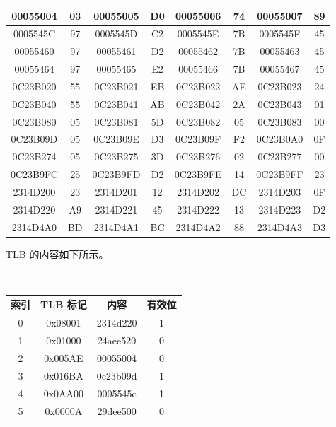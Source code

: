 \begin{problems}
\begin{table}[H]
\begin{tabular}{|c|c|c|c|c|c|c|c|}
                00055004 & 03 & 00055005 & D0 & 00055006 & 74 & 00055007 & 89 \\ \hline
                0005545C & 97 & 0005545D & C2 & 0005545E & 7B & 0005545F & 45 \\ \hline
                00055460 & 97 & 00055461 & D2 & 00055462 & 7B & 00055463 & 45 \\ \hline
                00055464 & 97 & 00055465 & E2 & 00055466 & 7B & 00055467 & 45 \\ \hline
                0C23B020 & 55 & 0C23B021 & EB & 0C23B022 & AE & 0C23B023 & 24 \\ \hline
                0C23B040 & 55 & 0C23B041 & AB & 0C23B042 & 2A & 0C23B043 & 01 \\ \hline
                0C23B080 & 05 & 0C23B081 & 5D & 0C23B082 & 05 & 0C23B083 & 00 \\ \hline
                0C23B09D & 05 & 0C23B09E & D3 & 0C23B09F & F2 & 0C23B0A0 & 0F \\ \hline
                0C23B274 & 05 & 0C23B275 & 3D & 0C23B276 & 02 & 0C23B277 & 00 \\ \hline
                0C23B9FC & 25 & 0C23B9FD & D2 & 0C23B9FE & 14 & 0C23B9FF & 23 \\ \hline
                2314D200 & 23 & 2314D201 & 12 & 2314D202 & DC & 2314D203 & 0F \\ \hline
                2314D220 & A9 & 2314D221 & 45 & 2314D222 & 13 & 2314D223 & D2 \\ \hline
                2314D4A0 & BD & 2314D4A1 & BC & 2314D4A2 & 88 & 2314D4A3 & D3 \\ \hline
            \end{tabular}
        \end{table}
        TLB 的内容如下所示。
        \begin{table}[H]
            \tt
            \centering
            \begin{tabular}{|c|c|c|c|}
                \hline
                索引 & TLB 标记 & 内容 & 有效位 \\ \hline
                0 & 0x08001 & 2314d220 & 1 \\ \hline
                1 & 0x01000 & 24aee520 & 0 \\ \hline
                2 & 0x005AE & 00055004 & 0 \\ \hline
                3 & 0x016BA & 0c23b09d & 1 \\ \hline
                4 & 0x0AA00 & 0005545c & 1 \\ \hline
                5 & 0x0000A & 29dee500 & 0 \\ \hline

\end{tabular}
\end{table}
\end{problems}
